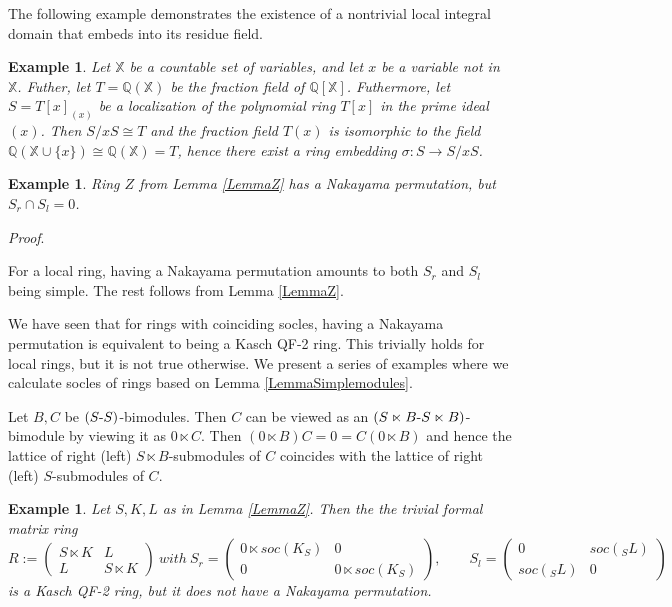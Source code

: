 \documentclass[11pt]{article}
\theoremstyle{plain}
\newtheorem{Ex}[veta]{Example}
\theoremstyle{remark}
\theoremstyle{plain}
\newenvironment{Proof}{
  \par\medskip\noindent
  \textit{Proof}.
}{
\newline
\rightline{$\qedsymbol$}
}
\begin{document}
The following example demonstrates the existence of a nontrivial local integral domain that embeds into its residue field.
\begin{Ex}  Let $\mathbb{X}$ be a countable set of variables, and let $x$ be a variable not in $\mathbb X$. Futher, let $T=\mathbb{Q}(\mathbb X)$ be the fraction field of $\mathbb{Q}[\mathbb X]$. Futhermore, let $S=T[x]_{(x)}$ be a localization of the polynomial ring $T[x]$ in the prime ideal $(x)$. Then $S/xS\cong T$ and  the fraction field $T(x)$ is isomorphic to the field $\mathbb{Q}(\mathbb X\cup \{x\})\cong \mathbb{Q}(\mathbb X)=T$, hence there exist a ring embedding $\sigma:S\to S/xS$.
\end{Ex}

\begin{Ex}\label{ExSocsDifer1}
    Ring $Z$ from Lemma \ref{LemmaZ} has a Nakayama permutation, but $S_r\cap S_l=0$.
\end{Ex}
\begin{Proof}
    For a local ring, having a Nakayama permutation amounts to both $S_r$ and $S_l$ being simple. The rest follows from Lemma \ref{LemmaZ}.
\end{Proof}

We have seen that for rings with coinciding socles, having a Nakayama permutation is equivalent to being a Kasch QF-2 ring. This trivially holds for local rings, but it is not true otherwise. We present a series of examples where we calculate socles of rings based on Lemma \ref{LemmaSimplemodules}.

Let $B, C$ be $(S\text-S)$-bimodules. Then $C$ can be viewed as an $(S\ltimes B\text-S\ltimes B)$-bimodule by viewing it as $0\ltimes C$. Then $(0\ltimes B)C=0=C(0\ltimes B)$ and hence the lattice of right (left) $S\ltimes B$-submodules of $C$ coincides with the lattice of right (left) $S$-submodules of $C$.
\begin{Ex} \label{ExQFKasch}
Let $S, K, L$ as in Lemma \ref{LemmaZ}. Then the the trivial formal matrix ring \[R:=\begin{pmatrix}
    S\ltimes K & L\\
    L & S\ltimes K
\end{pmatrix}~with~
        S_r=\begin{pmatrix}
        0\ltimes soc(K_S) & 0\\
        0 & 0\ltimes soc(K_S)
    \end{pmatrix},\qquad S_l=\begin{pmatrix}
        0&soc({_SL})\\
        soc({_SL}) & 0
    \end{pmatrix}
    \] is a Kasch QF-2 ring, but it does not have a Nakayama permutation.
\end{Ex}
\end{document}
